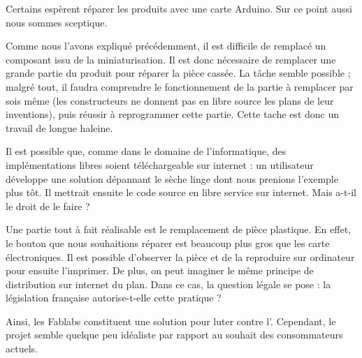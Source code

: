 \medbreak
Certains espèrent réparer les produits avec une carte Arduino. Sur ce point aussi nous sommes sceptique. 

Comme nous l'avons expliqué précédemment, il est difficile de remplacé un composant issu de la miniaturisation. Il est donc nécessaire de remplacer une grande partie du produit pour réparer la pièce cassée. La tâche semble possible ; malgré tout, il faudra comprendre le fonctionnement de la partie à remplacer par sois même (les constructeurs ne donnent pas en libre source les plans de leur inventions), puis réussir à reprogrammer cette partie. Cette tache est donc un travail de longue haleine. 

Il est possible que, comme dans le domaine de l'informatique, des implémentations libres soient téléchargeable sur internet : un utilisateur développe une solution dépannant le sèche linge dont nous prenions l'exemple plus tôt. Il mettrait ensuite le code source en libre service sur internet. Mais a-t-il le droit de le faire ? 

\medbreak 

Une partie tout à fait réalisable est le remplacement de pièce plastique. En effet, le bouton que nous souhaitions réparer est beaucoup plus gros que les carte électroniques. Il est possible d'observer la pièce et de la reproduire sur ordinateur pour ensuite l'imprimer. De plus, on peut imaginer le même principe de distribution sur internet du plan. Dans ce cas, la question légale se pose : la législation française autorise-t-elle cette pratique ? 

\bigbreak

Ainsi, les Fablabs constituent une solution pour luter contre l'\op. Cependant, le projet semble quelque peu idéaliste par rapport au souhait des consommateurs actuels. 
